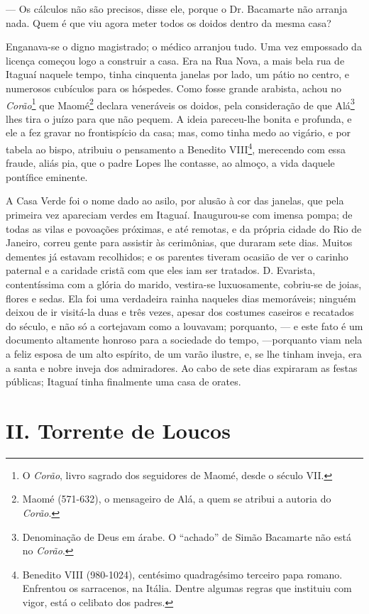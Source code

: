 --- Os cálculos não são precisos, disse ele, porque o Dr. Bacamarte não
arranja nada. Quem é que viu agora meter todos os doidos dentro da mesma
casa?

Enganava-se o digno magistrado; o médico arranjou tudo. Uma vez
empossado da licença começou logo a construir a casa. Era na Rua Nova, a
mais bela rua de Itaguaí naquele tempo, tinha cinquenta janelas por
lado, um pátio no centro, e numerosos cubículos para os hóspedes. Como
fosse grande arabista, achou no \emph{Corão}\footnote{O \emph{Corão},
  livro sagrado dos seguidores de Maomé, desde o século VII.} que
Maomé\footnote{Maomé (571-632), o mensageiro de Alá, a quem se atribui a
  autoria do \emph{Corão}.} declara veneráveis os doidos, pela
consideração de que Alá\footnote{Denominação de Deus em árabe. O
  ``achado'' de Simão Bacamarte não está no \emph{Corão}.} lhes tira o
juízo para que não pequem. A ideia pareceu-lhe bonita e profunda, e ele
a fez gravar no frontispício da casa; mas, como tinha medo ao vigário, e
por tabela ao bispo, atribuiu o pensamento a Benedito VIII\footnote{Benedito
  VIII (980-1024), centésimo quadragésimo terceiro papa romano.
  Enfrentou os sarracenos, na Itália. Dentre algumas regras que
  instituiu com vigor, está o celibato dos padres.}, merecendo com essa
fraude, aliás pia, que o padre Lopes lhe contasse, ao almoço, a vida
daquele pontífice eminente.

A Casa Verde foi o nome dado ao asilo, por alusão à cor das janelas, que
pela primeira vez apareciam verdes em Itaguaí. Inaugurou-se com imensa
pompa; de todas as vilas e povoações próximas, e até remotas, e da
própria cidade do Rio de Janeiro, correu gente para assistir às
cerimônias, que duraram sete dias. Muitos dementes já estavam
recolhidos; e os parentes tiveram ocasião de ver o carinho paternal e a
caridade cristã com que eles iam ser tratados. D. Evarista,
contentíssima com a glória do marido, vestira-se luxuosamente, cobriu-se
de joias, flores e sedas. Ela foi uma verdadeira rainha naqueles dias
memoráveis; ninguém deixou de ir visitá-la duas e três vezes, apesar dos
costumes caseiros e recatados do século, e não só a cortejavam como a
louvavam; porquanto, --- e este fato é um documento altamente honroso
para a sociedade do tempo, ---porquanto viam nela a feliz esposa de um
alto espírito, de um varão ilustre, e, se lhe tinham inveja, era a santa
e nobre inveja dos admiradores. Ao cabo de sete dias expiraram as festas
públicas; Itaguaí tinha finalmente uma casa de orates.

\chapter{II. Torrente de Loucos}

